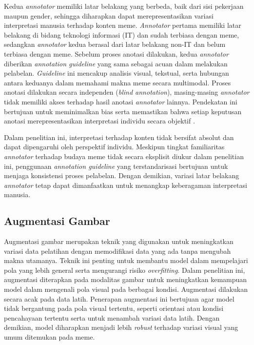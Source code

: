 Kedua \textit{annotator} memiliki latar belakang yang berbeda, baik dari sisi pekerjaan maupun gender, sehingga diharapkan dapat merepresentasikan variasi interpretasi manusia terhadap konten meme. \textit{Annotator} pertama memiliki latar belakang di bidang teknologi informasi (IT) dan sudah terbiasa dengan meme, sedangkan \textit{annotator} kedua berasal dari latar belakang non-IT dan belum terbiasa dengan meme. Sebelum proses anotasi dilakukan, kedua \textit{annotator} diberikan \textit{annotation guideline} yang sama sebagai acuan dalam melakukan pelabelan. \textit{Guideline} ini mencakup analisis visual, tekstual, serta hubungan antara keduanya dalam memahami makna meme secara multimodal. Proses anotasi dilakukan secara independen (\textit{blind annotation}), masing-masing \textit{annotator} tidak memiliki akses terhadap hasil anotasi \textit{annotator} lainnya. Pendekatan ini bertujuan untuk meminimalkan bias serta memastikan bahwa setiap keputusan anotasi merepresentasikan interpretasi individu secara objektif \cite{Perdana2025MultitaskNLU}.

Dalam penelitian ini, interpretasi terhadap konten tidak bersifat absolut dan dapat dipengaruhi oleh perspektif individu. Meskipun tingkat familiaritas \textit{annotator} terhadap budaya meme tidak secara eksplisit diukur dalam penelitian ini, penggunaan \textit{annotation guideline} yang terstandarisasi bertujuan untuk menjaga konsistensi proses pelabelan. Dengan demikian, variasi latar belakang \textit{annotator} tetap dapat dimanfaatkan untuk menangkap keberagaman interpretasi manusia.


\subsection{Augmentasi Gambar} \label{subsubsec:augmentasi_gambar}
Augmentasi gambar merupakan teknik yang digunakan untuk meningkatkan variasi data pelatihan dengan memodifikasi data yang ada tanpa mengubah makna utamanya. Teknik ini penting untuk membantu model dalam mempelajari pola yang lebih general serta mengurangi risiko \textit{overfitting}. Dalam penelitian ini, augmentasi diterapkan pada modalitas gambar untuk meningkatkan kemampuan model dalam mengenali pola visual pada berbagai kondisi. Augmentasi dilakukan secara acak pada data latih. Penerapan augmentasi ini bertujuan agar model tidak bergantung pada pola visual tertentu, seperti orientasi atau kondisi pencahayaan tertentu serta untuk menambah variasi data latih. Dengan demikian, model diharapkan menjadi lebih \textit{robust} terhadap variasi visual yang umum ditemukan pada meme.

